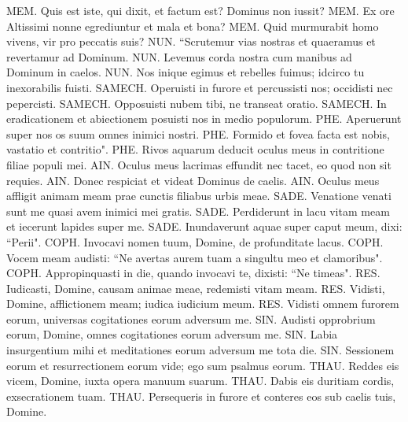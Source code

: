 \begin{biblechapter}
\verse MEM. Quis est iste, qui dixit, et factum est? Dominus non iussit? 
\verse MEM. Ex ore Altissimi nonne egrediuntur et mala et bona? 
\verse MEM. Quid murmurabit homo vivens, vir pro peccatis suis? 
\verse NUN. “Scrutemur vias nostras et quaeramus et revertamur ad Dominum. 
\verse NUN. Levemus corda nostra cum manibus ad Dominum in caelos. 
\verse NUN. Nos inique egimus et rebelles fuimus; idcirco tu inexorabilis fuisti. 
\verse SAMECH. Operuisti in furore et percussisti nos; occidisti nec pepercisti. 
\verse SAMECH. Opposuisti nubem tibi, ne transeat oratio. 
\verse SAMECH. In eradicationem et abiectionem posuisti nos in medio populorum. 
\verse PHE. Aperuerunt super nos os suum omnes inimici nostri. 
\verse PHE. Formido et fovea facta est nobis, vastatio et contritio". 
\verse PHE. Rivos aquarum deducit oculus meus in contritione filiae populi mei. 
\verse AIN. Oculus meus lacrimas effundit nec tacet, eo quod non sit requies. 
\verse AIN. Donec respiciat et videat Dominus de caelis. 
\verse AIN. Oculus meus affligit animam meam prae cunctis filiabus urbis meae. 
\verse SADE. Venatione venati sunt me quasi avem inimici mei gratis. 
\verse SADE. Perdiderunt in lacu vitam meam et iecerunt lapides super me. 
\verse SADE. Inundaverunt aquae super caput meum, dixi: “Perii". 
\verse COPH. Invocavi nomen tuum, Domine, de profunditate lacus. 
\verse COPH. Vocem meam audisti: “Ne avertas aurem tuam a singultu meo et clamoribus". 
\verse COPH. Appropinquasti in die, quando invocavi te, dixisti: “Ne timeas". 
\verse RES. Iudicasti, Domine, causam animae meae, redemisti vitam meam. 
\verse RES. Vidisti, Domine, afflictionem meam; iudica iudicium meum. 
\verse RES. Vidisti omnem furorem eorum, universas cogitationes eorum adversum me. 
\verse SIN. Audisti opprobrium eorum, Domine, omnes cogitationes eorum adversum me. 
\verse SIN. Labia insurgentium mihi et meditationes eorum adversum me tota die. 
\verse SIN. Sessionem eorum et resurrectionem eorum vide; ego sum psalmus eorum. 
\verse THAU. Reddes eis vicem, Domine, iuxta opera manuum suarum. 
\verse THAU. Dabis eis duritiam cordis, exsecrationem tuam. 
\verse THAU. Persequeris in furore et conteres eos sub caelis tuis, Domine. 
\end{biblechapter}

